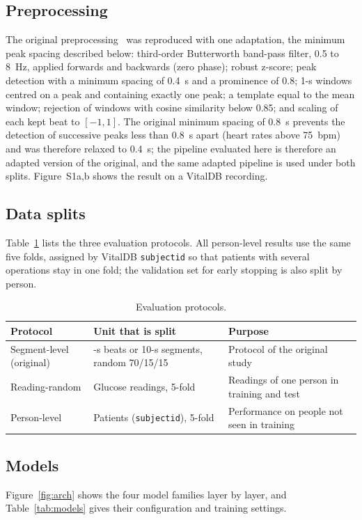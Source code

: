 \documentclass[11pt]{article}
\begin{document}
\subsection{Preprocessing}
The original preprocessing~\citep{zeynali2025} was reproduced with one adaptation, the minimum peak spacing described below: third-order Butterworth band-pass filter, 0.5 to 8~Hz, applied forwards and backwards (zero phase); robust z-score; peak detection with a minimum spacing of 0.4~s and a prominence of 0.8; 1-s windows centred on a peak and containing exactly one peak; a template equal to the mean window; rejection of windows with cosine similarity below 0.85; and scaling of each kept beat to $[-1,1]$. The original minimum spacing of 0.8~s prevents the detection of successive peaks less than 0.8~s apart (heart rates above 75~bpm) and was therefore relaxed to 0.4~s; the pipeline evaluated here is therefore an adapted version of the original, and the same adapted pipeline is used under both splits. Figure~S1a,b shows the result on a VitalDB recording.

\subsection{Data splits}
Table~\ref{tab:splits} lists the three evaluation protocols. All person-level results use the same five folds, assigned by VitalDB \texttt{subjectid} so that patients with several operations stay in one fold; the validation set for early stopping is also split by person.

\begin{table}[!htbp]
\centering\small
\caption{Evaluation protocols.}
\label{tab:splits}
\begin{tabularx}{\linewidth}{@{}l>{\RaggedRight}X>{\RaggedRight}X@{}}
\toprule
Protocol & Unit that is split & Purpose \\
\midrule
Segment-level (original) & 1-s beats or 10-s segments, random 70/15/15 & Protocol of the original study \\
Reading-random & Glucose readings, 5-fold & Readings of one person in training and test \\
Person-level & Patients (\texttt{subjectid}), 5-fold & Performance on people not seen in training \\
\bottomrule
\end{tabularx}
\end{table}

\subsection{Models}
Figure~\ref{fig:arch} shows the four model families layer by layer, and Table~\ref{tab:models} gives their configuration and training settings.
\end{document}

